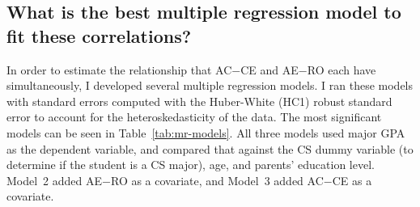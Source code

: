 \subsection{What is the best multiple regression model to fit these correlations?}
In order to estimate the relationship that AC$-$CE and AE$-$RO each have simultaneously, I developed several multiple regression models. I ran these models with standard errors computed with the Huber-White (HC1) robust standard error to account for the heteroskedasticity of the data. The most significant models can be seen in Table~\ref{tab:mr-models}. All three models used major GPA as the dependent variable, and compared that against the CS dummy variable (to determine if the student is a CS major), age, and parents' education level. Model~2 added AE$-$RO as a covariate, and Model~3 added AC$-$CE as a covariate.

